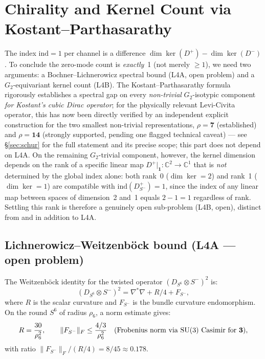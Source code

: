 \documentclass[12pt,a4paper]{article}
\newcommand{\ind}{\mathrm{ind}}
\newcommand{\CC}{\mathbb{C}}
\begin{document}
\section{Chirality and Kernel Count via Kostant--Parthasarathy}
\label{sec:kernel}

The index $\ind=1$ per channel is a difference $\dim\ker(D^+)-\dim\ker(D^-)$. To conclude
the zero-mode count is \emph{exactly}~1 (not merely $\geq 1$), we need two arguments:
a Bochner--Lichnerowicz spectral bound (L4A, open problem) and a $G_2$-equivariant
kernel count (L4B). The Kostant--Parthasarathy formula rigorously establishes a spectral
gap on every \emph{non-trivial} $G_2$-isotypic component \emph{for Kostant's cubic Dirac
operator}; for the physically relevant Levi-Civita operator, this has now been directly
verified by an independent explicit construction for the two smallest non-trivial
representations, $\rho=\mathbf{7}$ (established) and $\rho=\mathbf{14}$ (strongly supported,
pending one flagged technical caveat) --- see \S\ref{sec:schur} for the full statement and
its precise scope; this part does not depend on L4A. On the remaining $G_2$-trivial component, however,
the kernel dimension depends on the rank of a specific linear map
$D^+|_{\mathbf{1}}:\CC^2\to\CC^1$ that is \emph{not} determined by the global index alone:
both rank~0 ($\dim\ker=2$) and rank~1 ($\dim\ker=1$) are compatible with
$\ind(D^+_{S^-})=1$, since the index of any linear map between spaces of dimension~2
and~1 equals $2-1=1$ regardless of rank. Settling this rank is therefore a genuinely
open sub-problem (L4B, open), distinct from and in addition to L4A.

\subsection{Lichnerowicz--Weitzenb\"ock bound (L4A --- open problem)}
\label{sec:lichnerowicz}

The Weitzenb\"ock identity for the twisted operator $(D_{S^6}\otimes S^-)^2$ is:
\begin{equation}
  (D_{S^6}\otimes S^-)^2 = \nabla^*\nabla + R/4 + F_{S^-},
\end{equation}
where $R$ is the scalar curvature and $F_{S^-}$ is the bundle curvature endomorphism.
On the round $S^6$ of radius $\rho_6$, a norm estimate gives:
\begin{equation}
  R = \frac{30}{\rho_6^2}, \qquad \|F_{S^-}\|_F \leq \frac{4/3}{\rho_6^2}
  \quad\text{(Frobenius norm via SU(3) Casimir for \textbf{3})},
\end{equation}
with ratio $\|F_{S^-}\|_F/(R/4) = 8/45 \approx 0.178$.
\end{document}
